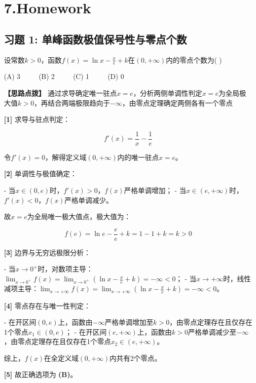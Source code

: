 \documentclass[11pt,a4paper,UTF8]{ctexart}
\begin{document}
\pagestyle{fancy}
\fancyhf{}
\fancyhead[R]{\small\color{TitlePurple}\nouppercase{\leftmark}}
\renewcommand{\headrulewidth}{0.5pt}

\tableofcontents
\newpage
{}


\section{7.Homework}


\subsection{习题 1: 单峰函数极值保号性与零点个数}

设常数$k > 0$，函数$f(x) = \ln x - \frac{x}{e} + k$在$(0, +\infty)$内的零点个数为( )

(A) 3 $\qquad$ (B) 2 $\qquad$ (C) 1 $\qquad$ (D) 0

\textbf{\color{DeepPurple}【思路点拨】} 通过求导确定唯一驻点$x = e$，分析两侧单调性判定$x = e$为全局极大值$k > 0$，再结合两端极限趋向于$-\infty$，由零点定理确定两侧各有一个零点


\begin{solbox}[分步推导与答题规范]
\textbf{[1]} 求导与驻点判定：


\begin{equation*}
f'(x) = \frac{1}{x} - \frac{1}{e}
\end{equation*}


令$f'(x) = 0$，解得定义域$(0, +\infty)$内的唯一驻点$x = e$。

\textbf{[2]} 单调性与极值确定：

- 当$x \in (0, e)$时，$f'(x) > 0$，$f(x)$严格单调增加；
- 当$x \in (e, +\infty)$时，$f'(x) < 0$，$f(x)$严格单调减少。

故$x = e$为全局唯一极大值点，极大值为：


\begin{equation*}
f(e) = \ln e - \frac{e}{e} + k = 1 - 1 + k = k > 0
\end{equation*}


\textbf{[3]} 边界与无穷远极限分析：

- 当$x \to 0^+$时，对数项主导：$\lim_{x \to 0^+} f(x) = \lim_{x \to 0^+} \left(\ln x - \frac{x}{e} + k\right) = -\infty < 0$；
- 当$x \to +\infty$时，线性减项主导：$\lim_{x \to +\infty} f(x) = \lim_{x \to +\infty} \left(\ln x - \frac{x}{e} + k\right) = -\infty < 0$。

\textbf{[4]} 零点存在与唯一性判定：

- 在开区间$(0, e)$上，函数由$-\infty$严格单调增加至$k > 0$，由零点定理存在且仅存在1个零点$x_1 \in (0, e)$；
- 在开区间$(e, +\infty)$上，函数由$k > 0$严格单调减少至$-\infty$，由零点定理存在且仅存在1个零点$x_2 \in (e, +\infty)$。

综上，$f(x)$在全定义域$(0, +\infty)$内共有2个零点。

\textbf{[5]} 故正确选项为 \textbf{(B)}。
\end{solbox}
\end{document}
